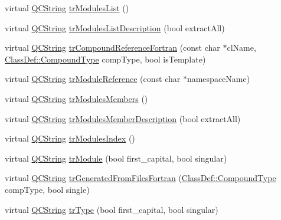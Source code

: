 \begin{DoxyCompactItemize}
\item 
virtual \mbox{\hyperlink{class_q_c_string}{Q\+C\+String}} \mbox{\hyperlink{class_translator_portuguese_af40f9186ffc3ad503109004b16de9102}{tr\+Modules\+List}} ()
\item 
virtual \mbox{\hyperlink{class_q_c_string}{Q\+C\+String}} \mbox{\hyperlink{class_translator_portuguese_a26f0e8e3e292052ff9893df61d6a1fa3}{tr\+Modules\+List\+Description}} (bool extract\+All)
\item 
virtual \mbox{\hyperlink{class_q_c_string}{Q\+C\+String}} \mbox{\hyperlink{class_translator_portuguese_aea1e34a1ca649b821afa250d2f105c14}{tr\+Compound\+Reference\+Fortran}} (const char $\ast$cl\+Name, \mbox{\hyperlink{class_class_def_ae70cf86d35fe954a94c566fbcfc87939}{Class\+Def\+::\+Compound\+Type}} comp\+Type, bool is\+Template)
\item 
virtual \mbox{\hyperlink{class_q_c_string}{Q\+C\+String}} \mbox{\hyperlink{class_translator_portuguese_a3bc783bc6fd0bd8b2731e28fea439660}{tr\+Module\+Reference}} (const char $\ast$namespace\+Name)
\item 
virtual \mbox{\hyperlink{class_q_c_string}{Q\+C\+String}} \mbox{\hyperlink{class_translator_portuguese_a54e355b689dd1ac2bb193bbda4f1bd8e}{tr\+Modules\+Members}} ()
\item 
virtual \mbox{\hyperlink{class_q_c_string}{Q\+C\+String}} \mbox{\hyperlink{class_translator_portuguese_a5a2541ba0a6c3b5e5917ed371c1a9e07}{tr\+Modules\+Member\+Description}} (bool extract\+All)
\item 
virtual \mbox{\hyperlink{class_q_c_string}{Q\+C\+String}} \mbox{\hyperlink{class_translator_portuguese_aa3ab8ee3c53ccb853010f877aff3f996}{tr\+Modules\+Index}} ()
\item 
virtual \mbox{\hyperlink{class_q_c_string}{Q\+C\+String}} \mbox{\hyperlink{class_translator_portuguese_a2b017c1d873be108d2f36647750e49bd}{tr\+Module}} (bool first\+\_\+capital, bool singular)
\item 
virtual \mbox{\hyperlink{class_q_c_string}{Q\+C\+String}} \mbox{\hyperlink{class_translator_portuguese_abcb08c99b34ea33779fd69a973cadbed}{tr\+Generated\+From\+Files\+Fortran}} (\mbox{\hyperlink{class_class_def_ae70cf86d35fe954a94c566fbcfc87939}{Class\+Def\+::\+Compound\+Type}} comp\+Type, bool single)
\item 
virtual \mbox{\hyperlink{class_q_c_string}{Q\+C\+String}} \mbox{\hyperlink{class_translator_portuguese_a8bdd953afe7c5bead1ce64134c68f3dc}{tr\+Type}} (bool first\+\_\+capital, bool singular)
\item 

\end{DoxyCompactItemize}
